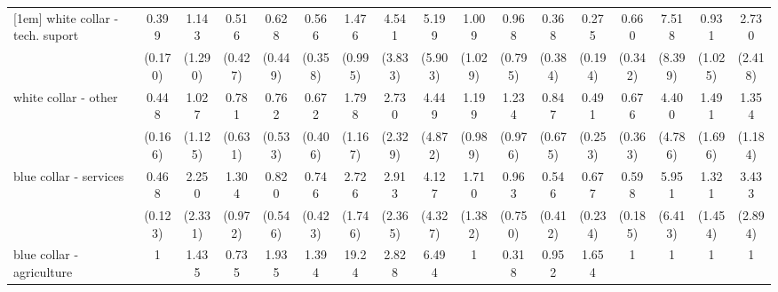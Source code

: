 {\begin{tabular}{l*{16}{c}}
[1em]
white collar - tech. suport&       0.399\sym{*}  &       1.143         &       0.516         &       0.628         &       0.566         &       1.476         &       4.541         &       5.199         &       1.009         &       0.968         &       0.368         &       0.275         &       0.660         &       7.518         &       0.931         &       2.730         \\
                    &     (0.170)         &     (1.290)         &     (0.427)         &     (0.449)         &     (0.358)         &     (0.995)         &     (3.833)         &     (5.903)         &     (1.029)         &     (0.795)         &     (0.384)         &     (0.194)         &     (0.342)         &     (8.399)         &     (1.025)         &     (2.418)         \\
[1em]
white collar - other&       0.448\sym{*}  &       1.027         &       0.781         &       0.762         &       0.672         &       1.798         &       2.730         &       4.449         &       1.199         &       1.234         &       0.847         &       0.491         &       0.676         &       4.400         &       1.491         &       1.354         \\
                    &     (0.166)         &     (1.125)         &     (0.631)         &     (0.533)         &     (0.406)         &     (1.167)         &     (2.329)         &     (4.872)         &     (0.989)         &     (0.976)         &     (0.675)         &     (0.253)         &     (0.363)         &     (4.786)         &     (1.696)         &     (1.184)         \\
[1em]
blue collar - services&       0.468\sym{**} &       2.250         &       1.304         &       0.820         &       0.746         &       2.726         &       2.913         &       4.127         &       1.710         &       0.963         &       0.546         &       0.677         &       0.598         &       5.951         &       1.321         &       3.433         \\
                    &     (0.123)         &     (2.331)         &     (0.972)         &     (0.546)         &     (0.423)         &     (1.746)         &     (2.365)         &     (4.327)         &     (1.382)         &     (0.750)         &     (0.412)         &     (0.234)         &     (0.185)         &     (6.413)         &     (1.454)         &     (2.894)         \\
[1em]
blue collar - agriculture&           1         &       1.435         &       0.735         &       1.935         &       1.394         &       19.24\sym{***}&       2.828         &       6.494         &           1         &       0.318         &       0.952         &       1.654         &           1         &           1         &           1         &           1         \\

\end{tabular}}

